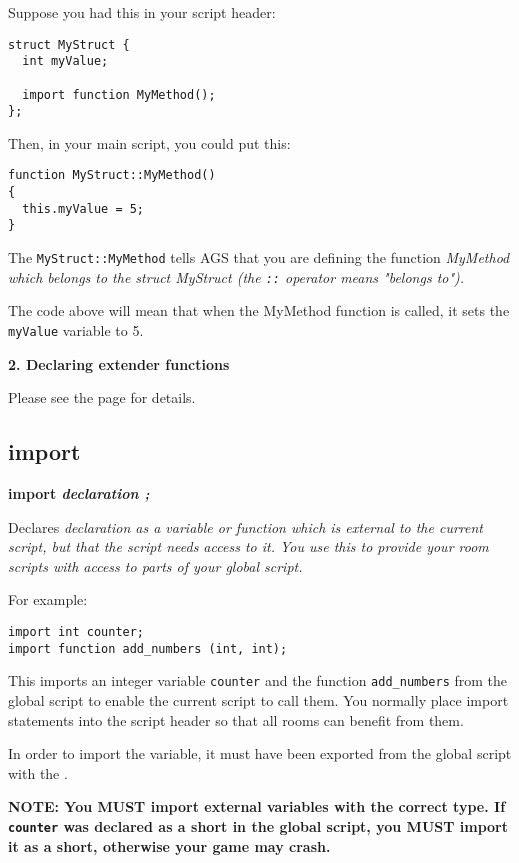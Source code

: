 Suppose you had this in your script header:
\begin{verbatim}
struct MyStruct {
  int myValue;

  import function MyMethod();
};
\end{verbatim}
Then, in your main script, you could put this:
\begin{verbatim}
function MyStruct::MyMethod()
{
  this.myValue = 5;
}
\end{verbatim}
The \verb$MyStruct::MyMethod$ tells AGS that you are defining the function \it{MyMethod}
which belongs to the struct \it{MyStruct} (the \verb$::$ operator means "belongs to").

The code above will mean that when the MyMethod function is called, it sets
the \verb$myValue$ variable to 5.

\bf{2. Declaring extender functions}

Please see the  page for details.


\subsection{import}\label{importkeyword}%

\bf{import} \it{declaration} ;

Declares \it{declaration} as a variable or function which is external to the current
script, but that the script needs access to it. You use this to provide your room scripts
with access to parts of your global script.

For example:

\begin{verbatim}
import int counter;
import function add_numbers (int, int);
\end{verbatim}

This imports an integer variable \verb$counter$ and the function \verb$add_numbers$ from
the global script to enable the current script to call them. You normally place import
statements into the script header so that all rooms can benefit from them.

In order to import the variable, it must have been exported from the global script
with the .

\bf{NOTE:} You \bf{MUST} import external variables with the correct type. If \verb$counter$
was declared as a \bf{short} in the global script, you MUST import it as a short, otherwise
your game may crash.

